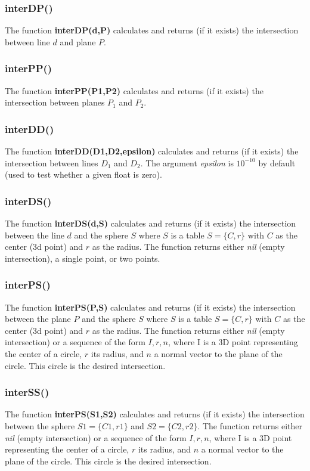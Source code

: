 \subsubsection{interDP()}
The function \textbf{interDP(d,P)} calculates and returns (if it exists) the intersection between line $d$ and plane $P$.

\subsubsection{interPP()}
The function \textbf{interPP(P1,P2)} calculates and returns (if it exists) the intersection between planes $P_1$ and $P_2$.

\subsubsection{interDD()}
The function \textbf{interDD(D1,D2,epsilon)} calculates and returns (if it exists) the intersection between lines $D_1$ and $D_2$. The argument \emph{epsilon} is $10^{-10}$ by default (used to test whether a given float is zero).

\subsubsection{interDS()}
The function \textbf{interDS(d,S)} calculates and returns (if it exists) the intersection between the line $d$ and the sphere $S$ where $S$ is a table $S=\{C,r\}$ with $C$ as the center (3d point) and $r$ as the radius. The function returns either \emph{nil} (empty intersection), a single point, or two points.

\subsubsection{interPS()}
The function \textbf{interPS(P,S)} calculates and returns (if it exists) the intersection between the plane $P$ and the sphere $S$ where $S$ is a table $S=\{C,r\}$ with $C$ as the center (3d point) and $r$ as the radius. The function returns either \emph{nil} (empty intersection) or a sequence of the form $I,r,n$, where I is a 3D point representing the center of a circle, $r$ its radius, and $n$ a normal vector to the plane of the circle. This circle is the desired intersection.

\subsubsection{interSS()}
The function \textbf{interPS(S1,S2)} calculates and returns (if it exists) the intersection between the sphere $S1=\{C1,r1\}$ and $S2=\{C2,r2\}$. The function returns either \emph{nil} (empty intersection) or a sequence of the form $I,r,n$, where I is a 3D point representing the center of a circle, $r$ its radius, and $n$ a normal vector to the plane of the circle. This circle is the desired intersection.

